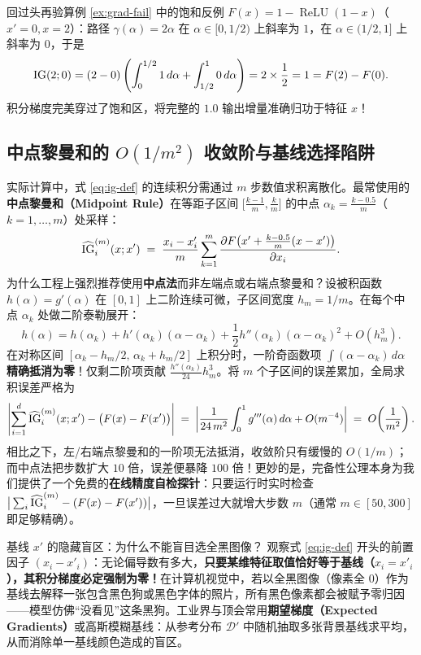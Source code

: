 回过头再验算例 \ref{ex:grad-fail} 中的饱和反例 $F(x) = 1 - \operatorname{ReLU}(1 - x)$（$x'=0, x=2$）：路径 $\gamma(\alpha) = 2\alpha$ 在 $\alpha \in [0, 1/2)$ 上斜率为 $1$，在 $\alpha \in (1/2, 1]$ 上斜率为 $0$，于是
\[
  \operatorname{IG}(2; 0) = (2 - 0)\left(\int_0^{1/2} 1\,d\alpha + \int_{1/2}^1 0\,d\alpha\right) = 2 \times \frac{1}{2} = 1 = F(2) - F(0).
\]
积分梯度完美穿过了饱和区，将完整的 $1.0$ 输出增量准确归功于特征 $x$！

\subsection{中点黎曼和的 $O(1/m^2)$ 收敛阶与基线选择陷阱}

实际计算中，式 \eqref{eq:ig-def} 的连续积分需通过 $m$ 步数值求积离散化。最常使用的\textbf{中点黎曼和（Midpoint Rule）}在等距子区间 $\big[\frac{k-1}{m}, \frac{k}{m}\big]$ 的中点 $\alpha_k = \frac{k - 0.5}{m}$（$k=1,\dots,m$）处采样：
\begin{equation}\label{eq:ig-midpoint}
  \widehat{\operatorname{IG}}_i^{(m)}(x; x') \;=\; \frac{x_i - x'_i}{m}\sum_{k=1}^m \frac{\partial F\!\left(x' + \frac{k - 0.5}{m}(x - x')\right)}{\partial x_i}.
\end{equation}
为什么工程上强烈推荐使用\textbf{中点法}而非左端点或右端点黎曼和？设被积函数 $h(\alpha) = g'(\alpha)$ 在 $[0,1]$ 上二阶连续可微，子区间宽度 $h_m = 1/m$。在每个中点 $\alpha_k$ 处做二阶泰勒展开：
\[
  h(\alpha) = h(\alpha_k) + h'(\alpha_k)(\alpha - \alpha_k) + \frac{1}{2}h''(\alpha_k)(\alpha - \alpha_k)^2 + O(h_m^3).
\]
在对称区间 $[\alpha_k - h_m/2,\, \alpha_k + h_m/2]$ 上积分时，一阶奇函数项 $\int (\alpha - \alpha_k)\,d\alpha$ \textbf{精确抵消为零}！仅剩二阶项贡献 $\frac{h''(\alpha_k)}{24}h_m^3$。将 $m$ 个子区间的误差累加，全局求积误差严格为
\begin{equation}\label{eq:ig-quad-err}
  \left|\sum_{i=1}^d \widehat{\operatorname{IG}}_i^{(m)}(x; x') - \big(F(x) - F(x')\big)\right|
  \;=\; \left|\frac{1}{24\,m^2}\int_0^1 g'''(\alpha)\,d\alpha + O(m^{-4})\right|
  \;=\; O\!\left(\frac{1}{m^2}\right).
\end{equation}
相比之下，左/右端点黎曼和的一阶项无法抵消，收敛阶只有缓慢的 $O(1/m)$；而中点法把步数扩大 $10$ 倍，误差便暴降 $100$ 倍！更妙的是，完备性公理本身为我们提供了一个免费的\textbf{在线精度自检探针}：只要运行时实时检查 $\big|\sum_i \widehat{\operatorname{IG}}_i^{(m)} - (F(x) - F(x'))\big|$，一旦误差过大就增大步数 $m$（通常 $m \in [50, 300]$ 即足够精确）。

\begin{insightBox}{基线 $x'$ 的隐藏盲区：为什么不能盲目选全黑图像？}
观察式 \eqref{eq:ig-def} 开头的前置因子 $(x_i - x'_i)$：无论偏导数有多大，\textbf{只要某维特征取值恰好等于基线（$x_i = x'_i$），其积分梯度必定强制为零！}在计算机视觉中，若以全黑图像（像素全 $0$）作为基线去解释一张包含黑色狗或黑色字体的照片，所有黑色像素都会被赋予零归因——模型仿佛“没看见”这条黑狗。工业界与顶会常用\textbf{期望梯度（Expected Gradients）}或高斯模糊基线：从参考分布 $\mathcal{D}'$ 中随机抽取多张背景基线求平均，从而消除单一基线颜色造成的盲区。
\end{insightBox}

